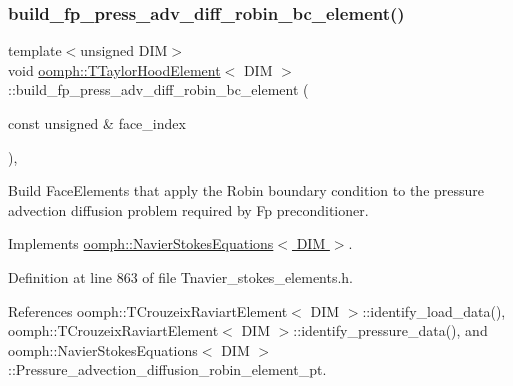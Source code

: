 \subsubsection{\texorpdfstring{build\+\_\+fp\+\_\+press\+\_\+adv\+\_\+diff\+\_\+robin\+\_\+bc\+\_\+element()}{build\_fp\_press\_adv\_diff\_robin\_bc\_element()}}
{\footnotesize\ttfamily template$<$unsigned D\+IM$>$ \\
void \hyperlink{classoomph_1_1TTaylorHoodElement}{oomph\+::\+T\+Taylor\+Hood\+Element}$<$ D\+IM $>$\+::build\+\_\+fp\+\_\+press\+\_\+adv\+\_\+diff\+\_\+robin\+\_\+bc\+\_\+element (\begin{DoxyParamCaption}\item[{const unsigned \&}]{face\+\_\+index }\end{DoxyParamCaption})\hspace{0.3cm}{\ttfamily [inline]}, {\ttfamily [virtual]}}



Build Face\+Elements that apply the Robin boundary condition to the pressure advection diffusion problem required by Fp preconditioner. 



Implements \hyperlink{classoomph_1_1NavierStokesEquations_a16bfab3df70ad2204217590c0e3b7de1}{oomph\+::\+Navier\+Stokes\+Equations$<$ D\+I\+M $>$}.



Definition at line 863 of file Tnavier\+\_\+stokes\+\_\+elements.\+h.



References oomph\+::\+T\+Crouzeix\+Raviart\+Element$<$ D\+I\+M $>$\+::identify\+\_\+load\+\_\+data(), oomph\+::\+T\+Crouzeix\+Raviart\+Element$<$ D\+I\+M $>$\+::identify\+\_\+pressure\+\_\+data(), and oomph\+::\+Navier\+Stokes\+Equations$<$ D\+I\+M $>$\+::\+Pressure\+\_\+advection\+\_\+diffusion\+\_\+robin\+\_\+element\+\_\+pt.

\mbox{\label{classoomph_1_1TTaylorHoodElement_a85a25696971d271d8e2fd407b7b593d7}} 
